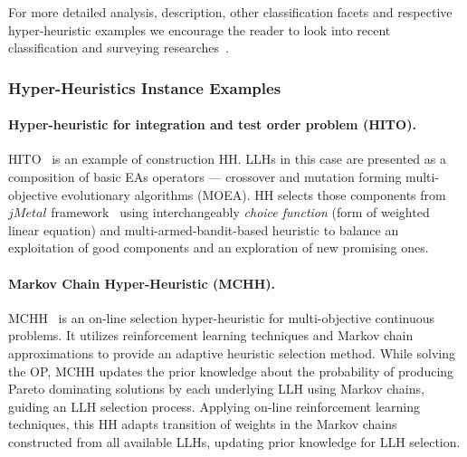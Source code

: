 
	


For more detailed analysis, description, other classification facets and respective hyper-heuristic examples we encourage the reader to look into recent classification and surveying researches~\cite{burke2003hyper,ryser2014review,drake2019recent,burke2019classification}.

\subsubsection{Hyper-Heuristics Instance Examples}\label{bg: hh examples}
\paragraph{Hyper-heuristic for integration and test order problem (HITO).} HITO~\cite{guizzo2015hyper} is an example of construction HH. LLHs in this case are presented as a composition of basic EAs operators — crossover and mutation forming multi-objective evolutionary algorithms (MOEA). HH selects those components from $jMetal$ framework~\cite{durillo2011jmetal} using interchangeably \emph{choice function} (form of weighted linear equation) and multi-armed-bandit-based heuristic to balance an exploitation of good components and an exploration of new promising ones.


\paragraph{Markov Chain Hyper-Heuristic (MCHH).} MCHH~\cite{mcclymont2011markov} is an on-line selection hyper-heuristic for multi-objective continuous problems. It utilizes reinforcement learning techniques and Markov chain approximations to provide an adaptive heuristic selection method. While solving the OP, MCHH updates the prior knowledge about the probability of producing Pareto dominating solutions by each underlying LLH using Markov chains, guiding an LLH selection process. Applying on-line reinforcement learning techniques, this HH adapts transition of weights in the Markov chains constructed from all available LLHs, updating prior knowledge for LLH selection.


